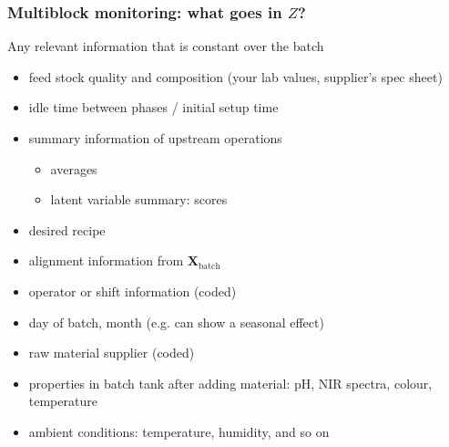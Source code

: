 \documentclass[handout, 12pt]{beamer}
\begin{document}
\begin{frame}\frametitle{Multiblock monitoring: what goes in \( Z \)?}

\begin{block}{}
Any relevant information that is constant over the batch 
\end{block}

\begin{itemize}
	\item	feed stock quality and composition (your lab values, supplier's spec sheet)	
	\item	idle time between phases / initial setup time
	\item	summary information of upstream operations
			\begin{itemize}
				\item	averages				
				\item	latent variable summary: scores
			\end{itemize}
	\item	desired recipe	
	\item	alignment information from \( \mathbf{X}_\text{batch} \)
	\item	operator or shift information (coded)
	\item	day of batch, month (e.g. can show a seasonal effect)
	\item	raw material supplier (coded)
	\item	properties in batch tank after adding material: pH, NIR spectra, colour, temperature
	\item	ambient conditions: temperature, humidity, and so on
\end{itemize}
\end{frame}
\end{document}
